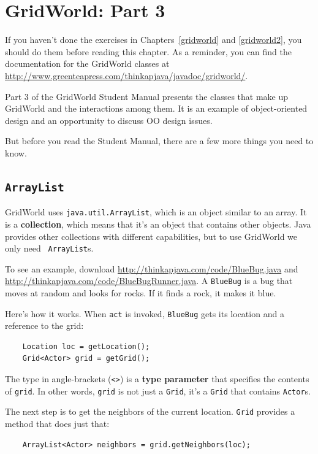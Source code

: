 \documentclass[12pt]{book}
\theoremstyle{exercise}
\begin{document}
\chapter{GridWorld: Part 3}
\label{gridworld3}

If you haven't done the exercises in Chapters~\ref{gridworld} and
\ref{gridworld2}, you should do them before reading this chapter.
As a reminder, you can find the
documentation for the GridWorld classes at
\url{http://www.greenteapress.com/thinkapjava/javadoc/gridworld/}.

Part 3 of the GridWorld Student Manual presents the classes that
make up GridWorld and the interactions among them.  It is an
example of object-oriented design and an opportunity to discuss OO
design issues.

But before you read the Student Manual, there are a few more things
you need to know.


\section{{\tt ArrayList}}

GridWorld uses {\tt java.util.ArrayList}, which is an object similar
to an array.  It is a {\bf collection}, which means that it's an
object that contains other objects.  Java provides other collections
with different capabilities, but to use GridWorld we only need {\tt
  ArrayList}s.

To see an example, download
\url{http://thinkapjava.com/code/BlueBug.java} and
\url{http://thinkapjava.com/code/BlueBugRunner.java}.
A {\tt BlueBug} is a bug that moves at random and looks for rocks.
If it finds a rock, it makes it blue.

Here's how it works.  When {\tt act} is invoked, {\tt BlueBug} gets
its location and a reference to the grid:

\begin{lstlisting}
    Location loc = getLocation();
    Grid<Actor> grid = getGrid();
\end{lstlisting}

The type in angle-brackets (\verb"<>") is a {\bf type parameter}
that specifies the contents of {\tt grid}.  In other words, {\tt grid}
is not just a {\tt Grid}, it's a {\tt Grid} that contains {\tt Actor}s.

The next step is to get the neighbors of the current location.
{\tt Grid} provides a method that does just that:

\begin{lstlisting}
    ArrayList<Actor> neighbors = grid.getNeighbors(loc);
\end{lstlisting}
\end{document}
